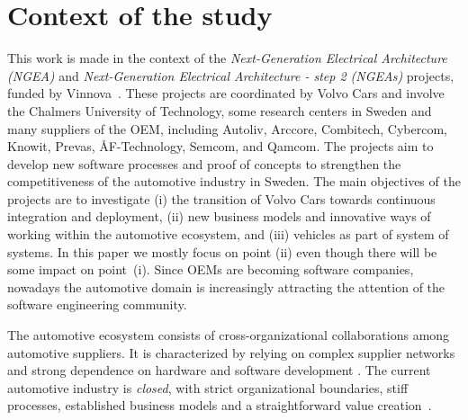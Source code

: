 \section{Context of the study}\label{sec:context}


This work is made in the context of the {\em Next-Generation Electrical Architecture (NGEA)} and {\em Next-Generation Electrical Architecture - step 2 (NGEAs)} projects, funded by Vinnova~\cite{Vinnova}. 
These projects are coordinated by Volvo Cars and involve the Chalmers University of Technology, some research centers in Sweden and many suppliers of the OEM, including Autoliv, Arccore, Combitech, Cybercom, Knowit, Prevas, \AA F-Technology, Semcom, and Qamcom. The projects aim to develop new software processes and proof of concepts to strengthen the competitiveness of the automotive industry in Sweden. The main objectives of the projects are to investigate (i) the transition of Volvo Cars towards continuous integration and deployment, (ii) new business models and innovative ways of working within the automotive ecosystem, and (iii) vehicles as part of system of systems. 
In this paper we mostly focus on point (ii) even though there will be some impact on point~(i). Since OEMs are becoming software companies, nowadays the automotive domain is increasingly attracting the attention of the software engineering community.  

The automotive ecosystem consists of cross-organizational collaborations among automotive suppliers. It is characterized by relying on complex supplier networks and strong dependence on hardware and software development \cite{Patrizio2016AAF_Chalmers,Knauss14d.:towards,Broy:2006:CAS:1134285.1134292}.
The current automotive industry is {\em closed}, with strict organizational boundaries, stiff processes, established business models and a straightforward value creation~\cite{ConnectedVehicle2012}.


